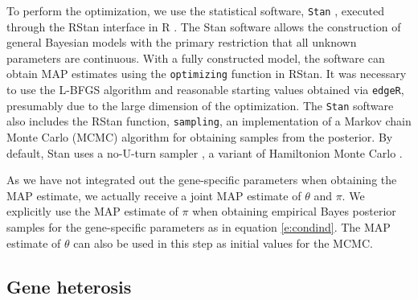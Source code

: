 \documentclass[useAMS,usenatbib,referee]{biom}
\begin{document}
To perform the optimization, we use the statistical software, {\tt Stan} \citep{stan-software:2014}, executed through the RStan interface \citep{rstan-software:2014} in R \citep{R2014}. The Stan software allows the construction of general Bayesian models with the primary restriction that all unknown parameters are continuous. With a fully constructed model, the software can obtain MAP estimates \cite[Section 50.3,][]{stan-manual:2014} using the {\tt optimizing} function in RStan. It was necessary to use the L-BFGS algorithm \cite[Section 55,][]{stan-manual:2014} and reasonable starting values obtained via {\tt edgeR}, presumably due to the large dimension of the optimization. The {\tt Stan} software also includes the RStan function, {\tt sampling}, an implementation of a Markov chain Monte Carlo (MCMC) algorithm for obtaining samples from the posterior. By default, Stan uses a no-U-turn sampler \citep{hoffman2013no}, a variant of Hamiltonion Monte Carlo \citep{neal2011mcmc}.

As we have not integrated out the gene-specific parameters when obtaining the MAP estimate, we actually receive a joint MAP estimate of $\theta$ and $\pi$. We explicitly use the MAP estimate of $\pi$ when obtaining empirical Bayes posterior samples for the gene-specific parameters as in equation \eqref{e:condind}. The MAP estimate of $\theta$ can also be used in this step as initial values for the MCMC. 

\subsection{Gene heterosis}
\label{s:gene_heterosis}
\end{document}

